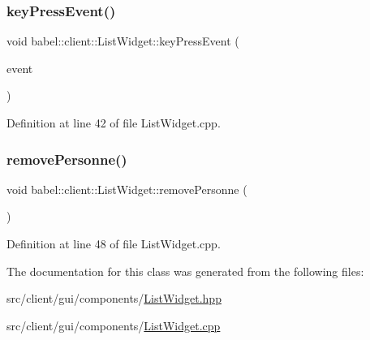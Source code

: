 \subsubsection{\texorpdfstring{key\+Press\+Event()}{keyPressEvent()}}
{\footnotesize\ttfamily void babel\+::client\+::\+List\+Widget\+::key\+Press\+Event (\begin{DoxyParamCaption}\item[{Q\+Key\+Event $\ast$}]{event }\end{DoxyParamCaption})}



Definition at line 42 of file List\+Widget.\+cpp.

\mbox{\label{classbabel_1_1client_1_1_list_widget_a69c381e8e2c881b9d8478d978f27ee55}} 
\subsubsection{\texorpdfstring{remove\+Personne()}{removePersonne()}}
{\footnotesize\ttfamily void babel\+::client\+::\+List\+Widget\+::remove\+Personne (\begin{DoxyParamCaption}{ }\end{DoxyParamCaption})}



Definition at line 48 of file List\+Widget.\+cpp.



The documentation for this class was generated from the following files\+:\begin{DoxyCompactItemize}
\item 
src/client/gui/components/\mbox{\hyperlink{_list_widget_8hpp}{List\+Widget.\+hpp}}\item 
src/client/gui/components/\mbox{\hyperlink{_list_widget_8cpp}{List\+Widget.\+cpp}}\end{DoxyCompactItemize}
